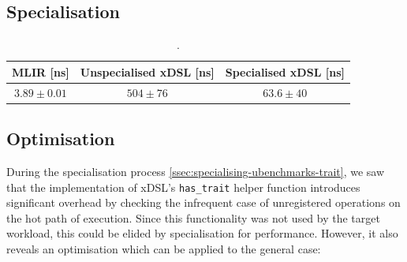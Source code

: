 \subsection{Specialisation}





\begin{table}[H]
  \caption{.}
  \label{tab:ubenchmark-trait-checks-optimised}
  \centering
  \begin{tabular}{ccc}
    \toprule
    \textbf{MLIR [ns]} & \textbf{Unspecialised xDSL [ns]} & \textbf{Specialised xDSL [ns]} \\
    \midrule
    $3.89 \pm 0.01$ & $504 \pm 76$ & $63.6 \pm 40$\\
    \bottomrule
  \end{tabular}
\end{table}





\subsection{Optimisation}


During the specialisation process \autoref{ssec:specialising-ubenchmarks-trait}, we saw that the implementation of xDSL's \texttt{has\_trait} helper function introduces significant overhead by checking the infrequent case of unregistered operations on the hot path of execution.
Since this functionality was not used by the target workload, this could be elided by specialisation for performance. However, it also reveals an optimisation which can be applied to the general case:


